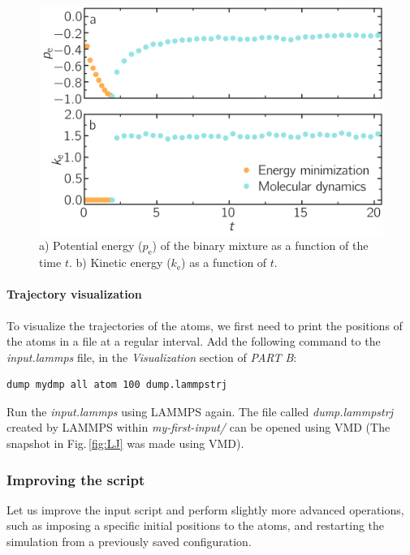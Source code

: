 \documentclass[9pt,tutorial]{livecoms}
\begin{document}
\begin{figure}
\centering
\includegraphics[width=\linewidth]{LJ-energy}
\caption{a) Potential energy ($p_\text{e}$) of the binary mixture as a function of the time $t$. b) Kinetic energy ($k_\text{e}$) as a function of $t$.}
\label{fig:evolution-energy}
\end{figure}

\paragraph{Trajectory visualization}

To visualize the trajectories of the atoms, we first need to print the positions of the atoms in a file at a regular interval. Add the following command to the \textit{input.lammps} file, in the \textit{Visualization} section of \textit{PART B}:
{\normalsize \begin{verbatim}
dump mydmp all atom 100 dump.lammpstrj
\end{verbatim}}
Run the \textit{input.lammps} using LAMMPS again. The file called \textit{dump.lammpstrj} created by LAMMPS within \textit{my-first-input/} can be opened using VMD (The snapshot in Fig.\,\ref{fig:LJ} was made using VMD).

\subsubsection{Improving the script}

Let us improve the input script and perform slightly more advanced operations, such as imposing a specific initial
positions to the atoms, and restarting the simulation from a previously saved configuration. 
\end{document}
